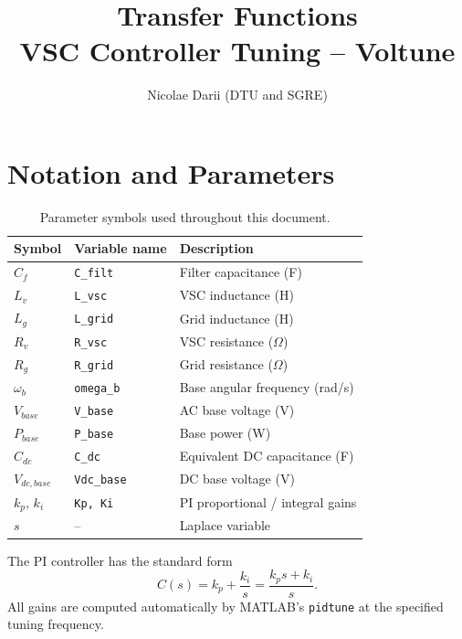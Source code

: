 \documentclass[12pt, a4paper]{article}
\title{\textbf{Transfer Functions} \\ \large VSC Controller Tuning -- Voltune}
\author{Nicolae Darii (DTU and SGRE)}
\date{}
\begin{document}
\maketitle
\thispagestyle{fancy}

\tableofcontents
\newpage

\section{Notation and Parameters}

\begin{table}[h!]
\centering
\renewcommand{\arraystretch}{1.3}
\begin{tabular}{lll}
\toprule
\textbf{Symbol} & \textbf{Variable name} & \textbf{Description} \\
\midrule
$C_f$         & \texttt{C\_filt}   & Filter capacitance (F) \\
$L_v$         & \texttt{L\_vsc}    & VSC inductance (H) \\
$L_g$         & \texttt{L\_grid}   & Grid inductance (H) \\
$R_v$         & \texttt{R\_vsc}    & VSC resistance ($\Omega$) \\
$R_g$         & \texttt{R\_grid}   & Grid resistance ($\Omega$) \\
$\omega_b$    & \texttt{omega\_b}  & Base angular frequency (rad/s) \\
$V_{base}$    & \texttt{V\_base}   & AC base voltage (V) \\
$P_{base}$    & \texttt{P\_base}   & Base power (W) \\
$C_{dc}$      & \texttt{C\_dc}     & Equivalent DC capacitance (F) \\
$V_{dc,base}$ & \texttt{Vdc\_base} & DC base voltage (V) \\
$k_p,\,k_i$   & \texttt{Kp, Ki}    & PI proportional / integral gains \\
$s$           & --                 & Laplace variable \\
\bottomrule
\end{tabular}
\caption{Parameter symbols used throughout this document.}
\end{table}

The PI controller has the standard form
\begin{equation}
    C(s) = k_p + \frac{k_i}{s} = \frac{k_p s + k_i}{s}.
\end{equation}
All gains are computed automatically by MATLAB's \texttt{pidtune} at the specified tuning frequency.
\end{document}
